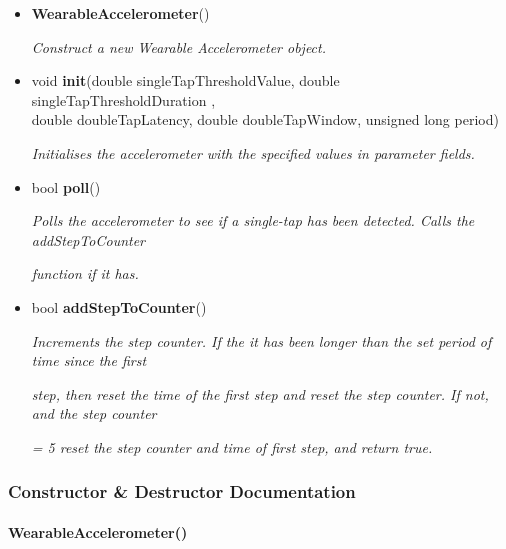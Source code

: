         \begin{itemize}
            \item \textbf{WearableAccelerometer}() 
            
                \quad \quad \textit{Construct a new Wearable Accelerometer object.}

            \item void \textbf{init}(double singleTapThresholdValue, double singleTapThresholdDuration
            , \\double doubleTapLatency, double doubleTapWindow, unsigned long period) 
            
                \quad \quad \textit{Initialises the accelerometer with the specified values in parameter fields.}

            \item bool \textbf{poll}() 
            
                \quad \quad \textit{Polls the accelerometer to see if a single-tap has been detected. Calls the addStepToCounter }

                \quad \quad \textit{function if it has.}

            \item bool \textbf{addStepToCounter}() 
            
                \quad \quad \textit{Increments the step counter. If the it has been longer than the set period of time since the first }
                
                \quad \quad \textit{step, then reset the time of the first step and reset the step counter. If not, and the step counter }
                
                \quad \quad \textit{= 5 reset the step counter and time of first step, and return true.}\\

        \end{itemize}

    \subsubsection{Constructor \& Destructor Documentation}\mbox{}


        \paragraph{WearableAccelerometer()}\mbox{}\\

